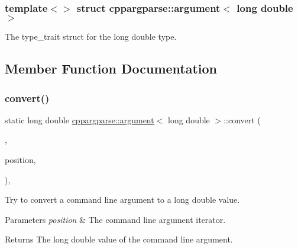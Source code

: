 \subsubsection*{template$<$$>$\newline
struct cppargparse\+::argument$<$ long double $>$}

The type\+\_\+trait struct for the long double type. 

\subsection{Member Function Documentation}
\mbox{\label{structcppargparse_1_1argument_3_01long_01double_01_4_a9987289594effd9b0561188827010cb2}} 
\subsubsection{\texorpdfstring{convert()}{convert()}}
{\footnotesize\ttfamily static long double \hyperlink{structcppargparse_1_1argument}{cppargparse\+::argument}$<$ long double $>$\+::convert (\begin{DoxyParamCaption}\item[{const \hyperlink{types_8h_a80adf2418b7ce9fe616698efa7533ecf}{types\+::\+Command\+Line\+\_\+t} \&}]{,  }\item[{const \hyperlink{types_8h_a43b4f43f8940de1bf09ced6f1b668053}{types\+::\+Command\+Line\+Position\+\_\+t} \&}]{position,  }\item[{const \hyperlink{types_8h_a003c660afe2ee9c6cc39aea966e8926d}{types\+::\+Command\+Line\+Arguments\+\_\+t} \&}]{ }\end{DoxyParamCaption})\hspace{0.3cm}{\ttfamily [inline]}, {\ttfamily [static]}}



Try to convert a command line argument to a long double value. 


\begin{DoxyParams}{Parameters}
{\em position} & The command line argument iterator.\\
\hline
\end{DoxyParams}
\begin{DoxyReturn}{Returns}
The long double value of the command line argument. 
\end{DoxyReturn}
\mbox{\label{structcppargparse_1_1argument_3_01long_01double_01_4_a3030b59e675dcf51191cfc6e61bd6141}} 
